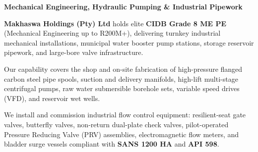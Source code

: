 \hypertarget{sec:mechanical}{}

\noindent
\begin{minipage}[t]{0.62\textwidth}
    \vspace{0pt}
    {\large\bfseries\color{mhnavy} Mechanical Engineering, Hydraulic Pumping \& Industrial Pipework}
    \vspace{0.12cm}

    {\fontsize{9pt}{13pt}\selectfont\color{mhtext}
    \textbf{Makhaswa Holdings (Pty) Ltd} holds elite \textbf{CIDB Grade 8 ME PE} (Mechanical Engineering up to R200M+), delivering turnkey industrial mechanical installations, municipal water booster pump stations, storage reservoir pipework, and large-bore valve infrastructure.
    }

    \vspace{0.22cm}

    {\fontsize{9pt}{13pt}\selectfont\color{mhtext}
    Our capability covers the shop and on-site fabrication of high-pressure flanged carbon steel pipe spools, suction and delivery manifolds, high-lift multi-stage centrifugal pumps, raw water submersible borehole sets, variable speed drives (VFD), and reservoir wet wells.
    }

    \vspace{0.22cm}

    {\fontsize{9pt}{13pt}\selectfont\color{mhtext}
    We install and commission industrial flow control equipment: resilient-seat gate valves, butterfly valves, non-return dual-plate check valves, pilot-operated Pressure Reducing Valve (PRV) assemblies, electromagnetic flow meters, and bladder surge vessels compliant with \textbf{SANS 1200 HA} and \textbf{API 598}.
    }
\end{minipage}
\hfill
